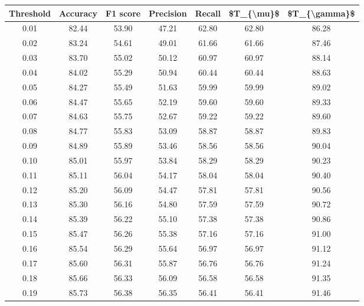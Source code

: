 \begin{tabular}{|c|c|c|c|c|c|c|}
\hline
 Threshold &  Accuracy &  F1 score &  Precision &  Recall &  \$T\_\{\textbackslash mu\}\$ &  \$T\_\{\textbackslash gamma\}\$ \\
\hline
      0.01 &     82.44 &     53.90 &      47.21 &   62.80 &      62.80 &         86.28 \\
      0.02 &     83.24 &     54.61 &      49.01 &   61.66 &      61.66 &         87.46 \\
      0.03 &     83.70 &     55.02 &      50.12 &   60.97 &      60.97 &         88.14 \\
      0.04 &     84.02 &     55.29 &      50.94 &   60.44 &      60.44 &         88.63 \\
      0.05 &     84.27 &     55.49 &      51.63 &   59.99 &      59.99 &         89.02 \\
      0.06 &     84.47 &     55.65 &      52.19 &   59.60 &      59.60 &         89.33 \\
      0.07 &     84.63 &     55.75 &      52.67 &   59.22 &      59.22 &         89.60 \\
      0.08 &     84.77 &     55.83 &      53.09 &   58.87 &      58.87 &         89.83 \\
      0.09 &     84.89 &     55.89 &      53.46 &   58.56 &      58.56 &         90.04 \\
      0.10 &     85.01 &     55.97 &      53.84 &   58.29 &      58.29 &         90.23 \\
      0.11 &     85.11 &     56.04 &      54.17 &   58.04 &      58.04 &         90.40 \\
      0.12 &     85.20 &     56.09 &      54.47 &   57.81 &      57.81 &         90.56 \\
      0.13 &     85.30 &     56.16 &      54.80 &   57.59 &      57.59 &         90.72 \\
      0.14 &     85.39 &     56.22 &      55.10 &   57.38 &      57.38 &         90.86 \\
      0.15 &     85.47 &     56.26 &      55.38 &   57.16 &      57.16 &         91.00 \\
      0.16 &     85.54 &     56.29 &      55.64 &   56.97 &      56.97 &         91.12 \\
      0.17 &     85.60 &     56.31 &      55.87 &   56.76 &      56.76 &         91.24 \\
      0.18 &     85.66 &     56.33 &      56.09 &   56.58 &      56.58 &         91.35 \\
      0.19 &     85.73 &     56.38 &      56.35 &   56.41 &      56.41 &         91.46 \\

\end{tabular}
